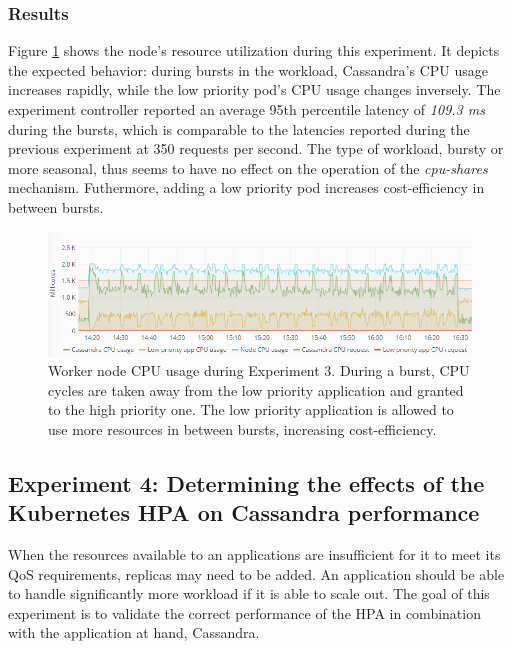 \subsubsection{Results}
Figure \ref{fig:cpu-cas-lpp-bursty} shows the node's resource utilization during this experiment. It depicts the expected behavior: during bursts in the workload, Cassandra's CPU usage increases rapidly, while the low priority pod's CPU usage changes inversely. The experiment controller reported an average 95th percentile latency of \textit{109.3 ms} during the bursts, which is comparable to the latencies reported during the previous experiment at 350 requests per second. The type of workload, bursty or more seasonal, thus seems to have no effect on the operation of the \textit{cpu-shares} mechanism. Futhermore, adding a low priority pod increases cost-efficiency in between bursts.

\begin{figure}[h]
\centering
\includegraphics[width=\textwidth]{Images/Experiments/CPU/Grafana/cpu-cas-lpp-bursty.PNG}
\caption{Worker node CPU usage during Experiment 3. During a burst, CPU cycles are taken away from the low priority application and granted to the high priority one. The low priority application is allowed to use more resources in between bursts, increasing cost-efficiency.}
\label{fig:cpu-cas-lpp-bursty}
\end{figure}

\subsection{Experiment 4: Determining the effects of the Kubernetes HPA on Cassandra performance}
\label{exp:hpa-cass}
When the resources available to an applications are insufficient for it to meet its QoS requirements, replicas may need to be added. An application should be able to handle significantly more workload if it is able to scale out. The goal of this experiment is to validate the correct performance of the HPA in combination with the application at hand, Cassandra. 

